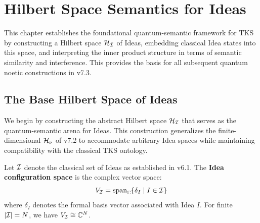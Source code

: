 
\chapter{Hilbert Space Semantics for Ideas}
\label{ch:hilbert-semantics-ideas}

\begin{tcolorbox}[colback=blue!5!white,colframe=blue!75!black,title=\vnewthree]
This chapter establishes the foundational quantum-semantic framework for TKS by constructing a Hilbert space $\mathcal{H}_{\mathcal{I}}$ of Ideas, embedding classical Idea states into this space, and interpreting the inner product structure in terms of semantic similarity and interference. This provides the basis for all subsequent quantum noetic constructions in v7.3.
\end{tcolorbox}

\section{The Base Hilbert Space of Ideas}
\label{sec:base-hilbert-ideas}

We begin by constructing the abstract Hilbert space $\mathcal{H}_{\mathcal{I}}$ that serves as the quantum-semantic arena for Ideas. This construction generalizes the finite-dimensional $\mathcal{H}_\nu$ of v7.2 to accommodate arbitrary Idea spaces while maintaining compatibility with the classical TKS ontology.

\begin{definition}
\label{def:idea-config-space}
Let $\mathcal{I}$ denote the classical set of Ideas as established in v6.1. The \textbf{Idea configuration space} is the complex vector space:
\[
V_{\mathcal{I}} = \mathrm{span}_{\mathbb{C}}\{\delta_I \mid I \in \mathcal{I}\}
\]
where $\delta_I$ denotes the formal basis vector associated with Idea $I$. For finite $|\mathcal{I}| = N$, we have $V_{\mathcal{I}} \cong \mathbb{C}^N$.
\end{definition}

